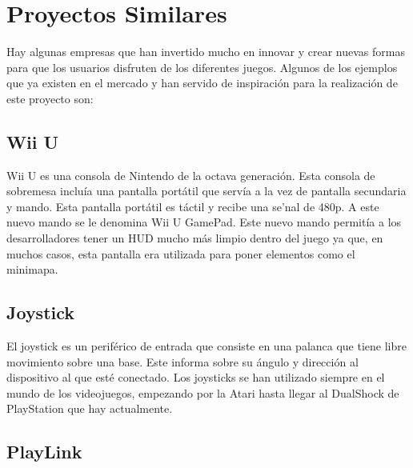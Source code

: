 \section{Proyectos Similares}

\label{cap2:sec:proyectos-similares}

Hay algunas empresas que han invertido mucho en innovar y crear nuevas formas para que los usuarios disfruten de los diferentes juegos. Algunos de los ejemplos que ya existen en el mercado y han servido de inspiraci\'on para la realizaci\'on de este proyecto son:

\subsection{Wii U}
\label{cap2:subsec:Wii U}
Wii U es una consola de Nintendo de la octava generaci\'on. Esta consola de sobremesa inclu\'ia una pantalla port\'atil que serv\'ia a la vez de pantalla secundaria y mando. Esta pantalla port\'atil es t\'actil y recibe una se'nal de 480p. A este nuevo mando se le denomina Wii U GamePad. Este nuevo mando permit\'ia a los desarrolladores tener un HUD mucho m\'as limpio dentro del juego ya que, en muchos casos, esta pantalla era utilizada para poner elementos como el minimapa. \\

\subsection{Joystick}
\label{cap2:subsec:Joystick}
El joystick es un perif\'erico de entrada que consiste en una palanca que tiene libre movimiento sobre una base. Este informa sobre su \'angulo y direcci\'on al dispositivo al que est\'e conectado.
Los joysticks se han utilizado siempre en el mundo de los videojuegos, empezando por la Atari hasta llegar al DualShock de PlayStation que hay actualmente.  \\

\subsection{PlayLink}
\label{cap2:subsec:PlayLink}


